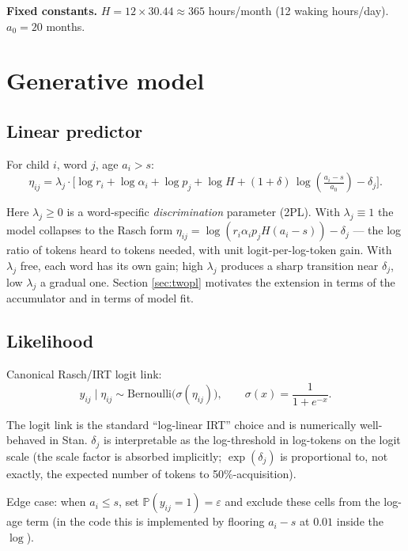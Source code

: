 \documentclass[11pt]{article}
\newcommand{\Prob}{\mathbb{P}}
\newcommand{\Bern}{\mathrm{Bernoulli}}
\newcommand{\sigmoid}{\sigma}
\begin{document}
\textbf{Fixed constants.} \(H = 12 \times 30.44 \approx 365\) hours/month
(12 waking hours/day). \(a_0 = 20\) months.

\section{Generative model}

\subsection{Linear predictor}

For child \(i\), word \(j\), age \(a_i > s\):
\begin{equation}
\eta_{ij}
= \lambda_j \cdot \Big[ \log r_i + \log \alpha_i
+ \log p_j + \log H
+ (1+\delta)\,\log\!\left(\tfrac{a_i - s}{a_0}\right)
- \delta_j \Big].
\label{eq:eta}
\end{equation}

Here \(\lambda_j \ge 0\) is a word-specific \emph{discrimination} parameter
(2PL). With \(\lambda_j \equiv 1\) the model collapses to the Rasch form
\(\eta_{ij} = \log(r_i \alpha_i p_j H (a_i - s)) - \delta_j\) — the log
ratio of tokens heard to tokens needed, with unit logit-per-log-token
gain. With \(\lambda_j\) free, each word has its own gain; high
\(\lambda_j\) produces a sharp transition near \(\delta_j\), low
\(\lambda_j\) a gradual one. Section \ref{sec:twopl} motivates the
extension in terms of the accumulator and in terms of model fit.

\subsection{Likelihood}

Canonical Rasch/IRT logit link:
\begin{equation}
y_{ij} \mid \eta_{ij} \sim \Bern\big(\sigmoid(\eta_{ij})\big),
\qquad \sigmoid(x) = \frac{1}{1 + e^{-x}}.
\label{eq:likelihood}
\end{equation}

The logit link is the standard ``log-linear IRT'' choice and is
numerically well-behaved in Stan. \(\delta_j\) is interpretable as the
log-threshold in log-tokens on the logit scale (the scale factor is
absorbed implicitly; \(\exp(\delta_j)\) is proportional to, not exactly,
the expected number of tokens to 50\%-acquisition).

Edge case: when \(a_i \le s\), set \(\Prob(y_{ij}=1) = \varepsilon\) and
exclude these cells from the log-age term (in the code this is
implemented by flooring $a_i - s$ at $0.01$ inside the $\log$).
\end{document}
